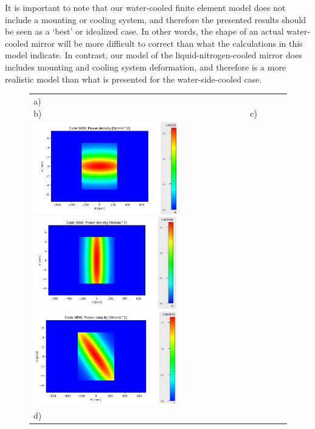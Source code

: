 \documentclass[]{spie}  %
\begin{document}
It is important to note that our water-cooled finite element model does not include a mounting or cooling system, and therefore the presented results should be seen as a `best' or idealized case.  In other words, the shape of an actual water-cooled mirror will be more difficult to correct than what the calculations in this model indicate. In contrast, our model of the liquid-nitrogen-cooled mirror does includes mounting and cooling system deformation, and therefore is a more realistic model than what is presented for the water-side-cooled case.








 

\begin{figure} [ht]
\begin{center}
\begin{tabular}{l} 
   a)~~~~~~~~~~~~~~~~~~~~~~~~~~~~~~~~~~~~~~~~~~~~~~~~~
   b)~~~~~~~~~~~~~~~~~~~~~~~~~~~~~~~~~~~~~~~~~~~~~~~~~c)\\
   \includegraphics[height=4cm]{figures/powerdensityKv.png}
   \includegraphics[height=4cm]{figures/powerdensityKh.png}
   \includegraphics[height=4cm]{figures/powerdensityKhKv.png} \\
      d)~~~~~~~~~~~~~~~~~~~~~~~~~~~~~~~~~~~~~~~~~~~~~~~~~

\end{tabular}
\end{center}
\end{figure}
\end{document}

